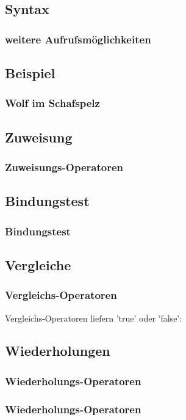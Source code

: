 \subsection{Syntax}
\begin{frame}
	\frametitle{weitere Aufrufsmöglichkeiten}
	
\end{frame}

\subsection{Beispiel}
\begin{frame}
	\frametitle{Wolf im Schafspelz}
	
\end{frame}




\subsection{Zuweisung}
\begin{frame}
	\frametitle{Zuweisungs-Operatoren}
	
\end{frame}




\subsection{Bindungstest}
\begin{frame}
	\frametitle{Bindungstest}
	
\end{frame}




\subsection{Vergleiche}
\begin{frame}
	\frametitle{Vergleichs-Operatoren}
	Vergleichs-Operatoren liefern  'true' oder 'false':
	
\end{frame}




\subsection{Wiederholungen}
\begin{frame}
	\frametitle{Wiederholungs-Operatoren}
	
\end{frame}
\begin{frame}
	\frametitle{Wiederholungs-Operatoren}
	
\end{frame}


